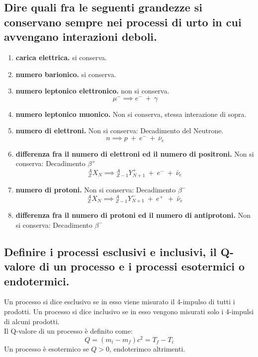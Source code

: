 \subsection[]{ Dire quali fra le seguenti grandezze si conservano sempre nei processi di urto in cui avvengano interazioni deboli.}
\begin{enumerate}
	\item \textbf{carica elettrica.} si conserva.
	\item \textbf{numero barionico.} si conserva.
	\item \textbf{numero leptonico elettronico.} non si conserva.
	\[
		\mu^- \implies e^- \ + \ \gamma
	\]
	\item \textbf{numero leptonico muonico.} Non si conserva, stessa interazione di sopra.
	\item \textbf{numero di elettroni.} Non si conserva: Decadimento del Neutrone.
	\[
		n \implies p \ + \ e^- \ + \ \overline{\nu}_{e}
	\] 
	\item \textbf{differenza fra il numero di elettroni ed il numero di positroni.} Non si conserva: Decadimento $\beta^+$
	\[
		{}^A_{Z}X_{N} \implies {}_{Z-1}^AY^+_{N+1} \ + \ e^- \ + \ \bar{\nu}_{e}
	\] 
	\item \textbf{numero di protoni.} Non si conserva: Decadimento $\beta^-$
	\[
		{}^A_{Z}X_{N} \implies {}_{Z-1}^AY^-_{N+1} \ + \ e^+ \ \ + \ \bar{\nu}_{e}
	\] 
	\item \textbf{differenza fra il numero di protoni ed il numero di antiprotoni.} Non si conserva: Decadimento $\beta^-$ 
\end{enumerate}

\subsection[]{ Definire i processi esclusivi e inclusivi, il Q-valore di un processo e i processi esotermici o endotermici.}
Un processo si dice esclusivo se in esso viene misurato il 4-impulso di tutti i prodotti. Un processo si dice inclusivo se in esso vengono misurati solo i 4-impulsi di alcuni prodotti.\\
Il Q-valore di un processo è definito come: 
\[
	Q = \left( m_{i} - m_{f} \right) c^2 = T_f - T_i
\]
Un processo è esotermico se $Q > 0$, endoterimco altrimenti.


